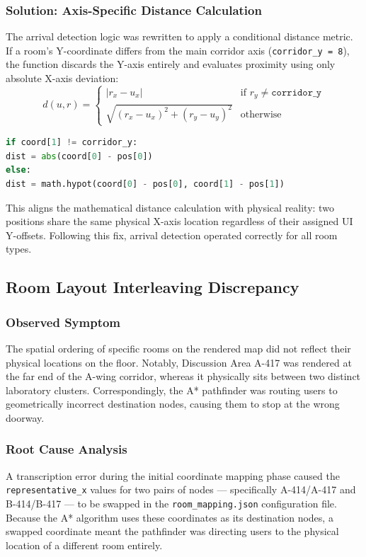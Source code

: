\documentclass[11pt,a4paper]{article}
\begin{document}
\subsubsection{Solution: Axis-Specific Distance Calculation}
The arrival detection logic was rewritten to apply a conditional distance metric. If a room's Y-coordinate differs from the main corridor axis (\texttt{corridor\_y = 8}), the function discards the Y-axis entirely and evaluates proximity using only absolute X-axis deviation:
\begin{equation}
d(u, r) = \begin{cases} |r_x - u_x| & \text{if } r_y \neq \texttt{corridor\_y} \\ \sqrt{(r_x - u_x)^2 + (r_y - u_y)^2} & \text{otherwise} \end{cases}
\end{equation}
\begin{lstlisting}[language=Python, caption=Axis-specific arrival distance in navigation.py]
if coord[1] != corridor_y:
dist = abs(coord[0] - pos[0])
else:
dist = math.hypot(coord[0] - pos[0], coord[1] - pos[1])
\end{lstlisting}
This aligns the mathematical distance calculation with physical reality: two positions share the same physical X-axis location regardless of their assigned UI Y-offsets. Following this fix, arrival detection operated correctly for all room types.
\subsection{Room Layout Interleaving Discrepancy}
\subsubsection{Observed Symptom}
The spatial ordering of specific rooms on the rendered map did not reflect their physical locations on the floor. Notably, Discussion Area A-417 was rendered at the far end of the A-wing corridor, whereas it physically sits between two distinct laboratory clusters. Correspondingly, the A* pathfinder was routing users to geometrically incorrect destination nodes, causing them to stop at the wrong doorway.
\subsubsection{Root Cause Analysis}
A transcription error during the initial coordinate mapping phase caused the \texttt{representative\_x} values for two pairs of nodes --- specifically A-414/A-417 and B-414/B-417 --- to be swapped in the \texttt{room\_mapping.json} configuration file. Because the A* algorithm uses these coordinates as its destination nodes, a swapped coordinate meant the pathfinder was directing users to the physical location of a different room entirely.
\end{document}
